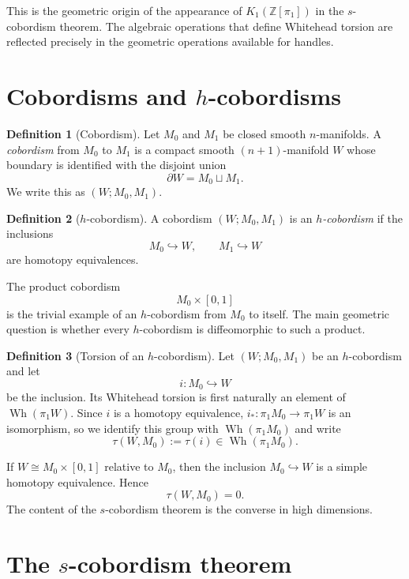 \documentclass[11pt,a4paper]{article}
\newcommand{\Wh}{\operatorname{Wh}}
\newcommand{\ZZ}{\mathbb{Z}}
\theoremstyle{definition}
\newtheorem{definition}{Definition}[section]
\theoremstyle{plain}
\theoremstyle{remark}
\begin{document}
This is the geometric origin of the appearance of \(K_1(\ZZ[\pi_1])\) in the \(s\)-cobordism theorem. The algebraic operations that define Whitehead torsion are reflected precisely in the geometric operations available for handles.

\section{Cobordisms and \texorpdfstring{\(h\)}{h}-cobordisms}

\begin{definition}[Cobordism]
Let \(M_0\) and \(M_1\) be closed smooth \(n\)-manifolds. A \emph{cobordism} from \(M_0\) to \(M_1\) is a compact smooth \((n+1)\)-manifold \(W\) whose boundary is identified with the disjoint union
\[
  \partial W=M_0\sqcup M_1.
\]
We write this as \((W;M_0,M_1)\).
\end{definition}

\begin{definition}[\(h\)-cobordism]
A cobordism \((W;M_0,M_1)\) is an \emph{\(h\)-cobordism} if the inclusions
\[
  M_0\hookrightarrow W,
  \qquad
  M_1\hookrightarrow W
\]
are homotopy equivalences.
\end{definition}

The product cobordism
\[
  M_0\times[0,1]
\]
is the trivial example of an \(h\)-cobordism from \(M_0\) to itself. The main geometric question is whether every \(h\)-cobordism is diffeomorphic to such a product.

\begin{definition}[Torsion of an \(h\)-cobordism]
Let \((W;M_0,M_1)\) be an \(h\)-cobordism and let
\[
  i:M_0\hookrightarrow W
\]
be the inclusion. Its Whitehead torsion is first naturally an element of \(\Wh(\pi_1W)\). Since \(i\) is a homotopy equivalence, \(i_*:\pi_1M_0\to\pi_1W\) is an isomorphism, so we identify this group with \(\Wh(\pi_1M_0)\) and write
\[
  \tau(W,M_0):=\tau(i)\in \Wh(\pi_1M_0).
\]
\end{definition}

If \(W\cong M_0\times[0,1]\) relative to \(M_0\), then the inclusion \(M_0\hookrightarrow W\) is a simple homotopy equivalence. Hence
\[
  \tau(W,M_0)=0.
\]
The content of the \(s\)-cobordism theorem is the converse in high dimensions.

\section{The \texorpdfstring{\(s\)}{s}-cobordism theorem}
\end{document}
